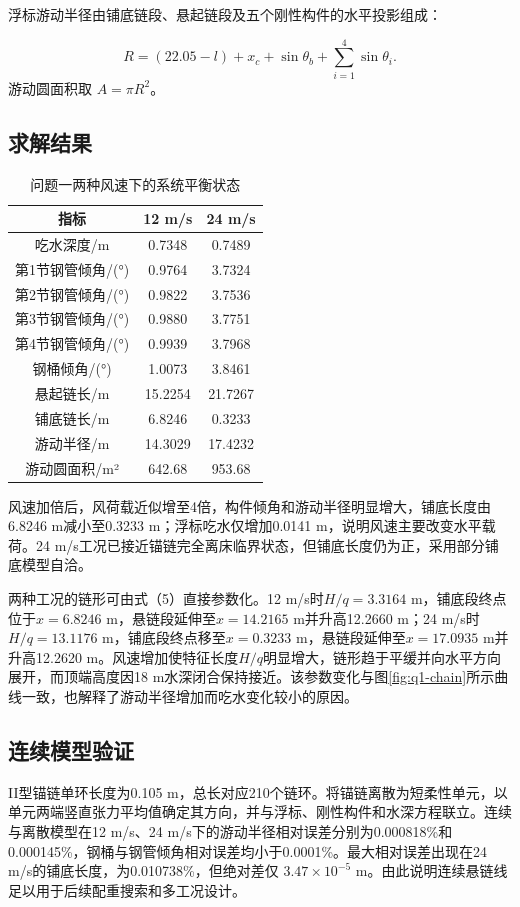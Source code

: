 \documentclass[UTF8,zihao=-4,a4paper,fontset=fandol]{ctexart}
\begin{document}
浮标游动半径由铺底链段、悬起链段及五个刚性构件的水平投影组成：

\[
R=(22.05-l)+x_c+\sin\theta_b+
\sum_{i=1}^{4}\sin\theta_i. \tag{7}
\]
游动圆面积取 \(A=\pi R^2\)。

\subsection{求解结果}
\begin{table}[H]\centering\small
\caption{问题一两种风速下的系统平衡状态}
\label{tab:q1-1}
\begin{tabular}{ccc}
\toprule
指标 & 12 m/s & 24 m/s \\
\midrule
吃水深度/m & 0.7348 & 0.7489 \\
第1节钢管倾角/(°) & 0.9764 & 3.7324 \\
第2节钢管倾角/(°) & 0.9822 & 3.7536 \\
第3节钢管倾角/(°) & 0.9880 & 3.7751 \\
第4节钢管倾角/(°) & 0.9939 & 3.7968 \\
钢桶倾角/(°) & 1.0073 & 3.8461 \\
悬起链长/m & 15.2254 & 21.7267 \\
铺底链长/m & 6.8246 & 0.3233 \\
游动半径/m & 14.3029 & 17.4232 \\
游动圆面积/m² & 642.68 & 953.68 \\
\bottomrule
\end{tabular}
\end{table}
风速加倍后，风荷载近似增至4倍，构件倾角和游动半径明显增大，铺底长度由6.8246 m减小至0.3233 m；浮标吃水仅增加0.0141 m，说明风速主要改变水平载荷。24 m/s工况已接近锚链完全离床临界状态，但铺底长度仍为正，采用部分铺底模型自洽。

两种工况的链形可由式（5）直接参数化。12 m/s时$H/q=3.3164$ m，铺底段终点位于$x=6.8246$ m，悬链段延伸至$x=14.2165$ m并升高12.2660 m；24 m/s时$H/q=13.1176$ m，铺底段终点移至$x=0.3233$ m，悬链段延伸至$x=17.0935$ m并升高12.2620 m。风速增加使特征长度$H/q$明显增大，链形趋于平缓并向水平方向展开，而顶端高度因18 m水深闭合保持接近。该参数变化与图\ref{fig:q1-chain}所示曲线一致，也解释了游动半径增加而吃水变化较小的原因。

\subsection{连续模型验证}
II型锚链单环长度为0.105 m，总长对应210个链环。将锚链离散为短柔性单元，以单元两端竖直张力平均值确定其方向，并与浮标、刚性构件和水深方程联立。连续与离散模型在12 m/s、24 m/s下的游动半径相对误差分别为0.000818\%和0.000145\%，钢桶与钢管倾角相对误差均小于0.0001\%。最大相对误差出现在24 m/s的铺底长度，为0.010738\%，但绝对差仅 \(3.47\times10^{-5}\) m。由此说明连续悬链线足以用于后续配重搜索和多工况设计。
\end{document}
